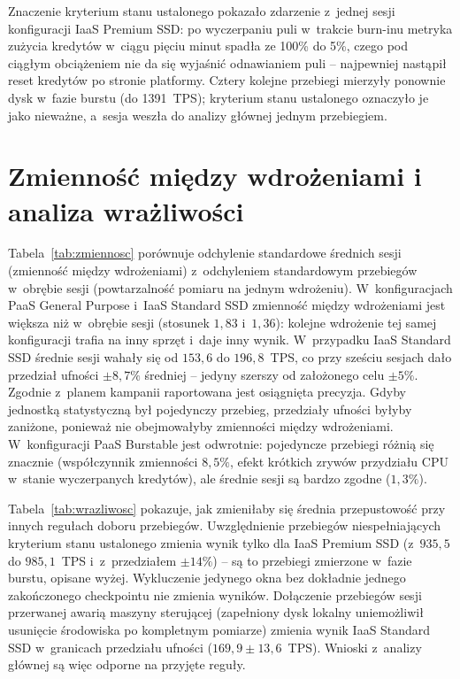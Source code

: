 Znaczenie kryterium stanu ustalonego pokazało zdarzenie z~jednej sesji konfiguracji IaaS
Premium SSD: po wyczerpaniu puli w~trakcie burn-inu metryka zużycia kredytów w~ciągu pięciu
minut spadła ze 100\% do 5\%, czego pod ciągłym obciążeniem nie da się wyjaśnić odnawianiem
puli -- najpewniej nastąpił reset kredytów po stronie platformy. Cztery kolejne przebiegi
mierzyły ponownie dysk w~fazie burstu (do 1391~TPS); kryterium stanu ustalonego oznaczyło
je jako nieważne, a~sesja weszła do analizy głównej jednym przebiegiem.

\section{Zmienność między wdrożeniami i analiza wrażliwości}
\label{sec:wyniki-zmiennosc}

Tabela~\ref{tab:zmiennosc} porównuje odchylenie standardowe średnich sesji (zmienność między
wdrożeniami) z~odchyleniem standardowym przebiegów w~obrębie sesji (powtarzalność pomiaru
na jednym wdrożeniu). W~konfiguracjach PaaS General Purpose i~IaaS Standard SSD zmienność
między wdrożeniami jest większa niż w~obrębie sesji (stosunek $1{,}83$ i~$1{,}36$): kolejne
wdrożenie tej samej konfiguracji trafia na inny sprzęt i~daje inny wynik. W~przypadku IaaS
Standard SSD średnie sesji wahały się od $153{,}6$ do $196{,}8$~TPS, co przy sześciu sesjach
dało przedział ufności $\pm8{,}7\%$ średniej -- jedyny szerszy od założonego celu $\pm5\%$.
Zgodnie z~planem kampanii raportowana jest osiągnięta precyzja. Gdyby jednostką statystyczną
był pojedynczy przebieg, przedziały ufności byłyby zaniżone, ponieważ nie obejmowałyby
zmienności między wdrożeniami. W~konfiguracji PaaS Burstable jest odwrotnie: pojedyncze
przebiegi różnią się znacznie (współczynnik zmienności $8{,}5\%$, efekt krótkich zrywów
przydziału CPU w~stanie wyczerpanych kredytów), ale średnie sesji są bardzo zgodne ($1{,}3\%$).

\begin{table}[htbp]
  \centering
  \caption{Zmienność przepustowości: odchylenie standardowe średnich sesji i~średnie odchylenie standardowe przebiegów w~sesji (TPS), współczynniki zmienności oraz ich stosunek}
  \label{tab:zmiennosc}
  \small
  
\end{table}

Tabela~\ref{tab:wrazliwosc} pokazuje, jak zmieniłaby się średnia przepustowość przy innych
regułach doboru przebiegów. Uwzględnienie przebiegów niespełniających kryterium stanu
ustalonego zmienia wynik tylko dla IaaS Premium SSD (z~$935{,}5$ do $985{,}1$~TPS i~z~przedziałem
$\pm14\%$) -- są to przebiegi zmierzone w~fazie burstu, opisane wyżej. Wykluczenie jedynego
okna bez dokładnie jednego zakończonego checkpointu nie zmienia wyników. Dołączenie
przebiegów sesji przerwanej awarią maszyny sterującej (zapełniony dysk lokalny uniemożliwił
usunięcie środowiska po kompletnym pomiarze) zmienia wynik IaaS Standard SSD w~granicach
przedziału ufności ($169{,}9 \pm 13{,}6$~TPS). Wnioski z~analizy głównej są więc odporne
na przyjęte reguły.

